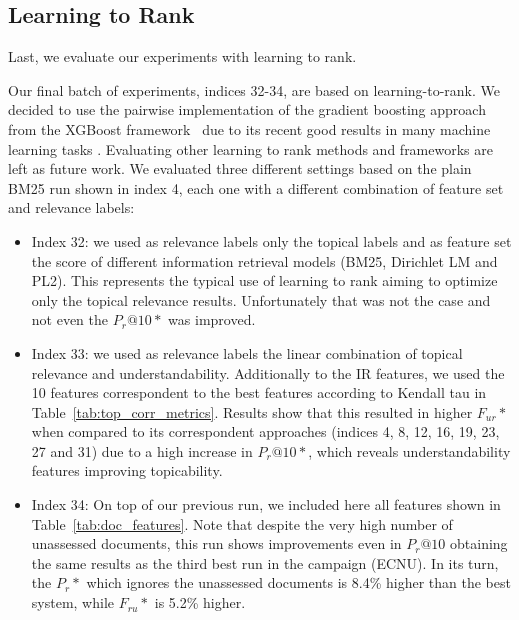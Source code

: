 \subsection{Learning to Rank}
\label{results:ltr}

Last, we evaluate our experiments with learning to rank. 


Our final batch of experiments, indices 32-34, are based on learning-to-rank. We decided to use the pairwise implementation of the gradient boosting approach from the XGBoost framework~\cite{chen16} due to its recent good results in many machine learning tasks . Evaluating other learning to rank methods and frameworks are left as future work.
We evaluated three different settings based on the plain BM25 run shown in index 4, each one with a different combination of feature set and relevance labels:
\begin{itemize}
    \item Index 32: we used as relevance labels only the topical labels and as feature set the score of different information retrieval models (BM25, Dirichlet LM and PL2). This represents the typical use of learning to rank aiming to optimize only the topical relevance results. Unfortunately that was not the case and not even the $P_r@10*$ was improved.
    \item Index 33: we used as relevance labels the linear combination of topical relevance and understandability. Additionally to the IR features, we used the 10 features correspondent to the best features according to Kendall tau in Table~\ref{tab:top_corr_metrics}. Results show that this resulted in higher $F_{ur}*$ when compared to its correspondent approaches (indices 4, 8, 12, 16, 19, 23, 27 and 31) due to a high increase in $P_r@10*$, which reveals understandability features improving topicability.
    \item Index 34: On top of our previous run, we included here all features shown in Table~\ref{tab:doc_features}. Note that despite the very high number of unassessed documents, this run shows improvements even in $P_r@10$ obtaining the same results as the third best run in the campaign (ECNU). In its turn, the $P_{r}*$ which ignores the unassessed documents is 8.4\% higher than the best system, while $F_{ru}*$ is 5.2\% higher.
\end{itemize}





